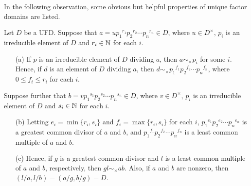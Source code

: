 In the following observation, some obvious but helpful properties of unique factor domains are listed.
\begin{obs}
Let $D$ be a UFD.
Suppose that $a=u{p_1}^{r_1}{p_2}^{r_2}\cdots{p_n}^{r_n}\in D$, where $u\in D^\times$, $p_i$ is an irreducible element of $D$ and $r_i\in{\mathbb{N}}$ for each $i$.
\begin{enumerate}
    \item[(a)]
    {
        If $p$ is an irreducible element of $D$ dividing $a$, then $a\sim_\times p_i$ for some $i$.
        Hence, if $d$ is an element of $D$ dividing $a$, then $d\sim_\times{p_1}^{f_1}{p_2}^{f_2}\cdots{p_n}^{f_n}$, where $0\leq f_i\leq r_i$ for each $i$.
    }
\end{enumerate}
Suppose further that $b=v{p_1}^{s_1}{p_2}^{s_2}\cdots{p_n}^{s_n}\in D$, where $v\in D^\times$, $p_i$ is an irreducible element of $D$ and $s_i\in{\mathbb{N}}$ for each $i$.
\begin{enumerate}
    \item[(b)]
    {
        Letting $e_i=\min\{r_i, s_i\}$ and $f_i=\max\{r_i, s_i\}$ for each $i$, ${p_1}^{e_1}{p_2}^{e_2}\cdots{p_n}^{e_n}$ is a greatest common divisor of $a$ and $b$, and ${p_1}^{f_1}{p_2}^{f_2}\cdots{p_n}^{f_n}$ is a least common multiple of $a$ and $b$.
    }
    \item[(c)]
    {
        Hence, if $g$ is a greatest common divisor and $l$ is a least common multiple of $a$ and $b$, respectively, then $gl\sim_\times ab$.
        Also, if $a$ and $b$ are nonzero, then $(l/a, l/b)=(a/g, b/g)=D$.
    }
\end{enumerate}
\end{obs}

